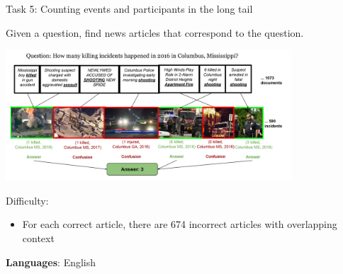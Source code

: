 \documentclass[10pt, compress]{beamer}
\begin{document}



\begin{frame}{Task 5: Counting events and participants in the long tail}

Given a question, find news articles that correspond to the question.

\begin{center}
  \includegraphics[width=0.8\textwidth]{graphics/events-task5-infographic.png}
\end{center}

Difficulty:
\begin{itemize}
  \item For each correct article, there are 674 incorrect articles with overlapping context 
\end{itemize}

\textbf{Languages}: English

\end{frame}





\end{document}
